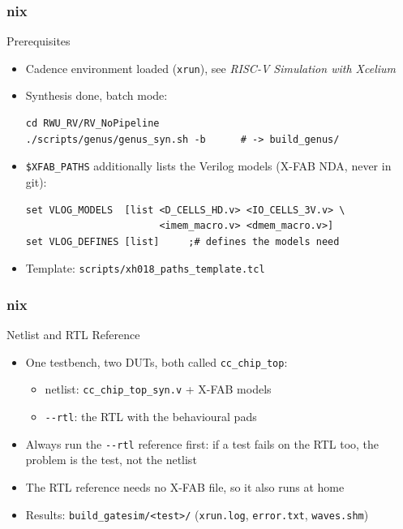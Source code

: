 \documentclass{beamer}
\newcommand{\astitle}{nix}
\newcommand{\assubtitle}{nix}
\newcommand{\cmd}[1]{\texttt{#1}}
\begin{document}
\renewcommand{\assubtitle}{Prerequisites}
\begin{frame}[fragile]
\frametitle{\astitle}
\begin{block}{\assubtitle}
  \begin{itemize}
    \item Cadence environment loaded (\cmd{xrun}), see \emph{RISC-V
      Simulation with Xcelium}
    \item Synthesis done, batch mode:
\begin{lstlisting}[style=sh]
cd RWU_RV/RV_NoPipeline
./scripts/genus/genus_syn.sh -b      # -> build_genus/
\end{lstlisting}
    \item \cmd{\$XFAB\_PATHS} additionally lists the Verilog models
      (X-FAB NDA, never in git):
\begin{lstlisting}[style=sh]
set VLOG_MODELS  [list <D_CELLS_HD.v> <IO_CELLS_3V.v> \
                       <imem_macro.v> <dmem_macro.v>]
set VLOG_DEFINES [list]     ;# defines the models need
\end{lstlisting}
    \item Template: \cmd{scripts/xh018\_paths\_template.tcl}
  \end{itemize}
\end{block}
\end{frame}

\renewcommand{\assubtitle}{Netlist and RTL Reference}
\begin{frame}
\frametitle{\astitle}
\begin{block}{\assubtitle}
  \begin{itemize}
    \item One testbench, two DUTs, both called \cmd{cc\_chip\_top}:
    \begin{itemize}
      \item netlist: \cmd{cc\_chip\_top\_syn.v} + X-FAB models
      \item \cmd{-{}-rtl}: the RTL with the behavioural pads
    \end{itemize}
    \item Always run the \cmd{-{}-rtl} reference first: if a test fails on
      the RTL too, the problem is the test, not the netlist
    \item The RTL reference needs no X-FAB file, so it also runs at home
    \item Results: \cmd{build\_gatesim/<test>/}
      (\cmd{xrun.log}, \cmd{error.txt}, \cmd{waves.shm})
  \end{itemize}
\end{block}
\end{frame}
\end{document}
